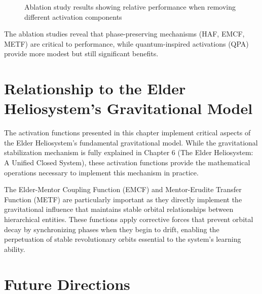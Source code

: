 \begin{figure}[h]
\centering
{}
\caption{Ablation study results showing relative performance when removing different activation components}
\end{figure}

The ablation studies reveal that phase-preserving mechanisms (HAF, EMCF, METF) are critical to performance, while quantum-inspired activations (QPA) provide more modest but still significant benefits.

\section{Relationship to the Elder Heliosystem's Gravitational Model}

The activation functions presented in this chapter implement critical aspects of the Elder Heliosystem's fundamental gravitational model. While the gravitational stabilization mechanism is fully explained in Chapter 6 (The Elder Heliosystem: A Unified Closed System), these activation functions provide the mathematical operations necessary to implement this mechanism in practice.

The Elder-Mentor Coupling Function (EMCF) and Mentor-Erudite Transfer Function (METF) are particularly important as they directly implement the gravitational influence that maintains stable orbital relationships between hierarchical entities. These functions apply corrective forces that prevent orbital decay by synchronizing phases when they begin to drift, enabling the perpetuation of stable revolutionary orbits essential to the system's learning ability.

\section{Future Directions}

